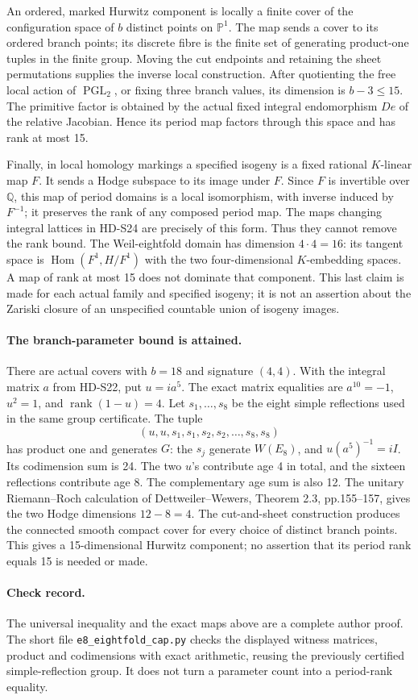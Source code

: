 An ordered, marked Hurwitz component is locally a finite cover of
the configuration space of \(b\) distinct points on \(\mathbb P^1\).
The map sends a cover to its ordered branch points; its discrete fibre
is the finite set of generating product-one tuples in the finite group.
Moving the cut endpoints and retaining the sheet permutations supplies
the inverse local construction. After quotienting the free local action
of \(\operatorname{PGL}_2\), or fixing three branch values, its
dimension is \(b-3\le15\). The primitive factor is obtained by
the actual fixed integral endomorphism \(De\) of the relative
Jacobian. Hence its period map factors through this space and has rank
at most 15.

Finally, in local homology markings a specified isogeny is a fixed
rational \(K\)-linear map \(F\). It sends a Hodge subspace to
its image under \(F\). Since \(F\) is invertible over
\(\mathbb Q\), this map of period domains is a local isomorphism,
with inverse induced by \(F^{-1}\); it preserves the rank of any
composed period map. The maps changing integral lattices in HD-S24
are precisely of this form. Thus they cannot remove the rank bound.
The Weil-eightfold domain has dimension \(4\cdot4=16\): its
tangent space is \(\operatorname{Hom}(F^1,H/F^1)\) with the two
four-dimensional \(K\)-embedding spaces. A map of rank at most 15
does not dominate that component. This last claim is made for each
actual family and specified isogeny; it is not an assertion about the
Zariski closure of an unspecified countable union of isogeny images.

\paragraph{The branch-parameter bound is attained.}
There are actual covers with \(b=18\) and signature \((4,4)\).
With the integral matrix \(a\) from HD-S22, put \(u=ia^5\).
The exact matrix equalities are \(a^{10}=-1\), \(u^2=1\), and
\(\operatorname{rank}(1-u)=4\). Let \(s_1,\ldots,s_8\) be
the eight simple reflections used in the same group certificate.
The tuple
\[
 (u,u,s_1,s_1,s_2,s_2,\ldots,s_8,s_8)
\]
has product one and generates \(G\): the \(s_j\) generate
\(W(E_8)\), and \(u(a^5)^{-1}=iI\). Its codimension sum is
24. The two \(u\)'s contribute age 4 in total, and the sixteen
reflections contribute age 8. The complementary age sum is also 12.
The unitary Riemann--Roch calculation of Dettweiler--Wewers,
Theorem 2.3, pp.155--157, gives the two Hodge dimensions
\(12-8=4\). The cut-and-sheet construction produces the connected
smooth compact cover for every choice of distinct branch points.
This gives a 15-dimensional Hurwitz component; no assertion that its
period rank equals 15 is needed or made.

\paragraph{Check record.}
The universal inequality and the exact maps above are a complete
author proof. The short file \texttt{e8\_eightfold\_cap.py}
checks the displayed witness matrices, product and codimensions with
exact arithmetic, reusing the previously certified simple-reflection
group. It does not turn a parameter count into a period-rank equality.
